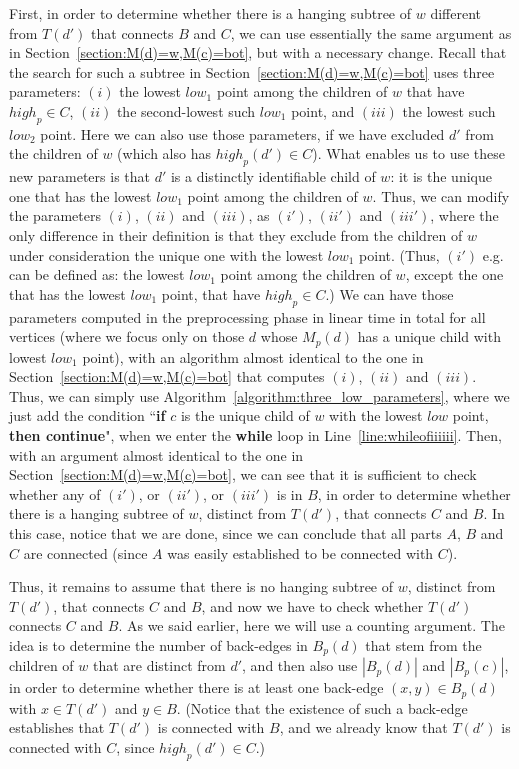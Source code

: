 \documentclass[11pt,a4paper]{article}
\begin{document}
First, in order to determine whether there is a hanging subtree of $w$ different from $T(d')$ that connects $B$ and $C$, we can use essentially the same argument as in Section~\ref{section:M(d)=w,M(c)=bot}, but with a necessary change. Recall that the search for such a subtree in Section~\ref{section:M(d)=w,M(c)=bot} uses three parameters: $(i)$ the lowest $\mathit{low}_1$ point among the children of $w$ that have $\mathit{high}_p\in C$, $(ii)$ the second-lowest such $\mathit{low}_1$ point, and $(iii)$ the lowest such $\mathit{low}_2$ point. Here we can also use those parameters, if we have excluded $d'$ from the children of $w$ (which also has $\mathit{high}_p(d')\in C$). What enables us to use these new parameters is that $d'$ is a distinctly identifiable child of $w$: it is the unique one that has the lowest $\mathit{low}_1$ point among the children of $w$. Thus, we can modify the parameters $(i)$, $(ii)$ and $(iii)$, as $(i')$, $(ii')$ and $(iii')$, where the only difference in their definition is that they exclude from the children of $w$ under consideration the unique one with the lowest $\mathit{low}_1$ point. (Thus, $(i')$ e.g. can be defined as: the lowest $\mathit{low}_1$ point among the children of $w$, except the one that has the lowest $\mathit{low}_1$ point, that have $\mathit{high}_p\in C$.) We can have those parameters computed in the preprocessing phase in linear time in total for all vertices (where we focus only on those $d$ whose $M_p(d)$ has a unique child with lowest $\mathit{low}_1$ point), with an algorithm almost identical to the one in Section~\ref{section:M(d)=w,M(c)=bot} that computes $(i)$, $(ii)$ and $(iii)$. Thus, we can simply use Algorithm~\ref{algorithm:three_low_parameters}, where we just add the condition ``\textbf{if} $c$ is the unique child of $w$ with the lowest $\mathit{low}$ point, \textbf{then continue}", when we enter the \textbf{while} loop in Line~\ref{line:whileofiiiiii}. Then, with an argument almost identical to the one in Section~\ref{section:M(d)=w,M(c)=bot}, we can see that it is sufficient to check whether any of $(i')$, or $(ii')$, or $(iii')$ is in $B$, in order to determine whether there is a hanging subtree of $w$, distinct from $T(d')$, that connects $C$ and $B$. In this case, notice that we are done, since we can conclude that all parts $A$, $B$ and $C$ are connected (since $A$ was easily established to be connected with $C$).

Thus, it remains to assume that there is no hanging subtree of $w$, distinct from $T(d')$, that connects $C$ and $B$, and now we have to check whether $T(d')$ connects $C$ and $B$. As we said earlier, here we will use a counting argument. The idea is to determine the number of back-edges in $B_p(d)$ that stem from the children of $w$ that are distinct from $d'$, and then also use $|B_p(d)|$ and $|B_p(c)|$, in order to determine whether there is at least one back-edge $(x,y)\in B_p(d)$ with $x\in T(d')$ and $y\in B$. (Notice that the existence of such a back-edge establishes that $T(d')$ is connected with $B$, and we already know that $T(d')$ is connected with $C$, since $\mathit{high}_p(d')\in C$.)
\end{document}
